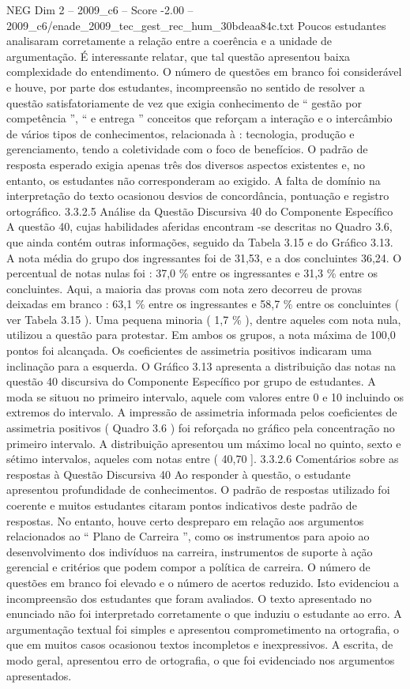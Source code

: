 \begin{textsample}{NEG Dim 2 – 2009\_c6 – Score -2.00 – 2009\_c6/enade\_2009\_tec\_gest\_rec\_hum\_30bdeaa84c.txt}
Poucos estudantes analisaram corretamente a relação entre a coerência e a unidade de argumentação.
É interessante relatar, que tal questão apresentou baixa complexidade do entendimento.
O número de questões em branco foi considerável e houve, por parte dos estudantes, incompreensão no sentido de resolver a questão satisfatoriamente de vez que exigia conhecimento de “ gestão por competência ”, “ e entrega ” conceitos que reforçam a interação e o intercâmbio de vários tipos de conhecimentos, relacionada à : tecnologia, produção e gerenciamento, tendo a coletividade com o foco de benefícios.
O padrão de resposta esperado exigia apenas três dos diversos aspectos existentes e, no entanto, os estudantes não corresponderam ao exigido.
A falta de domínio na interpretação do texto ocasionou desvios de concordância, pontuação e registro ortográfico. 3.3.2.5 Análise da Questão Discursiva 40 do Componente Específico A questão 40, cujas habilidades aferidas encontram -se descritas no Quadro 3.6, que ainda contém outras informações, seguido da Tabela 3.15 e do Gráfico 3.13.
A nota média do grupo dos ingressantes foi de 31,53, e a dos concluintes 36,24.
O percentual de notas nulas foi : 37,0 \% entre os ingressantes e 31,3 \% entre os concluintes.
Aqui, a maioria das provas com nota zero decorreu de provas deixadas em branco : 63,1 \% entre os ingressantes e 58,7 \% entre os concluintes ( ver Tabela 3.15 ).
Uma pequena minoria ( 1,7 \% ), dentre aqueles com nota nula, utilizou a questão para protestar.
Em ambos os grupos, a nota máxima de 100,0 pontos foi alcançada.
Os coeficientes de assimetria positivos indicaram uma inclinação para a esquerda.
O Gráfico 3.13 apresenta a distribuição das notas na questão 40 discursiva do Componente Específico por grupo de estudantes.
A moda se situou no primeiro intervalo, aquele com valores entre 0 e 10 incluindo os extremos do intervalo.
A impressão de assimetria informada pelos coeficientes de assimetria positivos ( Quadro 3.6 ) foi reforçada no gráfico pela concentração no primeiro intervalo.
A distribuição apresentou um máximo local no quinto, sexto e sétimo intervalos, aqueles com notas entre ( 40,70 ]. 3.3.2.6 Comentários sobre as respostas à Questão Discursiva 40 Ao responder à questão, o estudante apresentou profundidade de conhecimentos.
O padrão de respostas utilizado foi coerente e muitos estudantes citaram pontos indicativos deste padrão de respostas.
No entanto, houve certo despreparo em relação aos argumentos relacionados ao “ Plano de Carreira ”, como os instrumentos para apoio ao desenvolvimento dos indivíduos na carreira, instrumentos de suporte à ação gerencial e critérios que podem compor a política de carreira.
O número de questões em branco foi elevado e o número de acertos reduzido.
Isto evidenciou a incompreensão dos estudantes que foram avaliados.
O texto apresentado no enunciado não foi interpretado corretamente o que induziu o estudante ao erro.
A argumentação textual foi simples e apresentou comprometimento na ortografia, o que em muitos casos ocasionou textos incompletos e inexpressivos.
A escrita, de modo geral, apresentou erro de ortografia, o que foi evidenciado nos argumentos apresentados.


\end{textsample}
